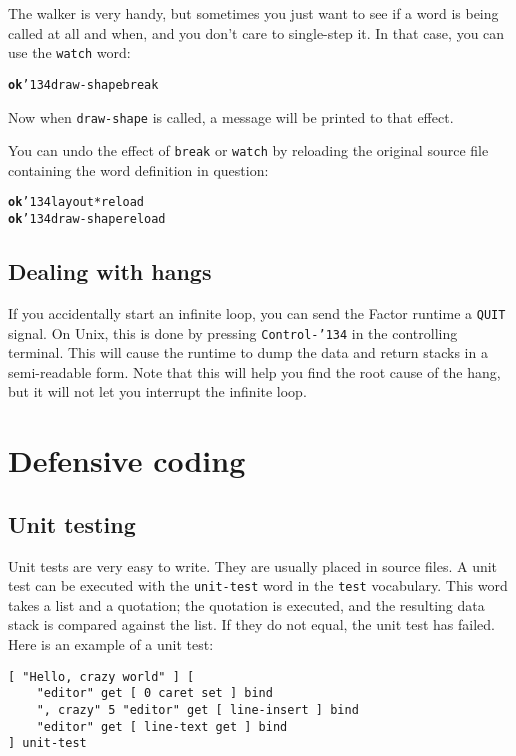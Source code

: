 \documentclass{book}
\newcommand{\bs}{\char'134}
\begin{document}
The walker is very handy, but sometimes you just want to see if a word is being called at all and when, and you don't care to single-step it. In that case, you can use the \texttt{watch} word:

\begin{alltt}
\textbf{ok} \bs draw-shape break
\end{alltt}

Now when \texttt{draw-shape} is called, a message will be printed to that effect.

You can undo the effect of \texttt{break} or \texttt{watch} by reloading the original source file containing the word definition in question:

\begin{alltt}
\textbf{ok} \bs layout* reload
\textbf{ok} \bs draw-shape reload
\end{alltt}

\subsection{Dealing with hangs}

If you accidentally start an infinite loop, you can send the Factor runtime a \texttt{QUIT} signal. On Unix, this is done by pressing \texttt{Control-\bs} in the controlling terminal. This will cause the runtime to dump the data and return stacks in a semi-readable form. Note that this will help you find the root cause of the hang, but it will not let you interrupt the infinite loop.


\section{Defensive coding}

\subsection{Unit testing}

Unit tests are very easy to write. They are usually placed in source files. A unit test can be executed with the \texttt{unit-test} word in the \texttt{test} vocabulary. This word takes a list and a quotation; the quotation is executed, and the resulting data stack is compared against the list. If they do not equal, the unit test has failed. Here is an example of a unit test:

\begin{verbatim}
[ "Hello, crazy world" ] [
    "editor" get [ 0 caret set ] bind
    ", crazy" 5 "editor" get [ line-insert ] bind
    "editor" get [ line-text get ] bind
] unit-test
\end{verbatim}
\end{document}
